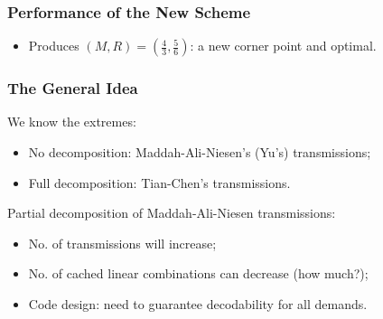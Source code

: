 \documentclass{beamer}
\begin{document}
\begin{frame}
\frametitle{Performance of the New Scheme}

\begin{itemize}
\item Produces $(M,R)=(\frac{4}{3},\frac{5}{6})$: a new corner point and optimal.
\end{itemize}

\end{frame}

\begin{frame}
\frametitle{The General Idea}

We know the extremes:
\begin{itemize} 
\item No decomposition: Maddah-Ali-Niesen's (Yu\rq{}s) transmissions;
\item Full decomposition: Tian-Chen's transmissions.
\end{itemize}

\pause
\vspace{0.3cm}
Partial decomposition of Maddah-Ali-Niesen transmissions:
\begin{itemize}
	\item No. of transmissions will increase;
	\item No. of cached linear combinations can decrease (how much?);
	\item Code design: need to guarantee decodability for all demands.
\end{itemize} 

\pause
\vspace{20pt}
\centering{\textcolor{blue}{Question: how to best decompose the transmissions?}}
\end{frame}
\end{document}
